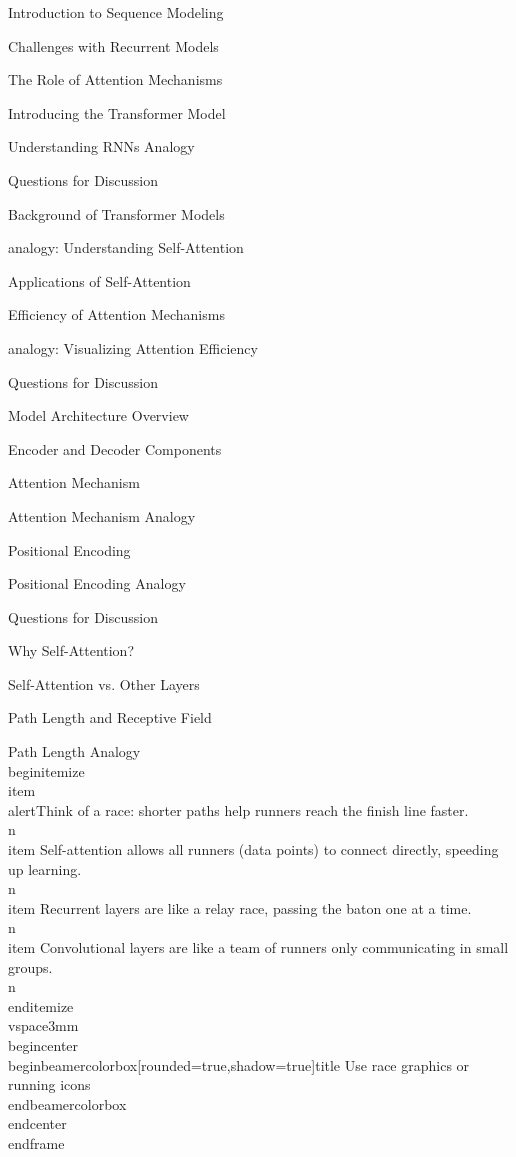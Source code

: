 \documentclass{beamer}
\begin{document}
\begin{frame}[]{Introduction to Sequence Modeling}
\begin{frame}[]{Challenges with Recurrent Models}
\begin{frame}[]{The Role of Attention Mechanisms}
\begin{frame}[]{Introducing the Transformer Model}
\begin{frame}[plain]{Understanding RNNs Analogy}
\begin{frame}[]{Questions for Discussion}
\begin{frame}[]{Background of Transformer Models}
\begin{frame}[plain]{analogy: Understanding Self-Attention}
\begin{frame}[]{Applications of Self-Attention}
\begin{frame}[]{Efficiency of Attention Mechanisms}
\begin{frame}[plain]{analogy: Visualizing Attention Efficiency}
\begin{frame}[]{Questions for Discussion}
\begin{frame}[]{Model Architecture Overview}
\begin{frame}[]{Encoder and Decoder Components}
\begin{frame}[]{Attention Mechanism}
\begin{frame}[plain]{Attention Mechanism Analogy}
\begin{frame}[]{Positional Encoding}
\begin{frame}[plain]{Positional Encoding Analogy}
\begin{frame}[]{Questions for Discussion}
\begin{frame}[]{Why Self-Attention?}
\begin{frame}[]{Self-Attention vs. Other Layers}
\begin{frame}[]{Path Length and Receptive Field}
\begingroup
{}\n{}\n\begin{frame}[plain]{Path Length Analogy}\n\\begin{itemize}
\\item \\alert{Think of a race: shorter paths help runners reach the finish line faster.}\\n\\item Self-attention allows all runners (data points) to connect directly, speeding up learning.\\n\\item Recurrent layers are like a relay race, passing the baton one at a time.\\n\\item Convolutional layers are like a team of runners only communicating in small groups.\\n\\end{itemize}
\\vspace{3mm}
\\begin{center}
\\begin{beamercolorbox}[rounded=true,shadow=true]{title}
Use race graphics or running icons
\\end{beamercolorbox}
\\end{center}
\\end{frame}

\endgroup


\end{frame}
\end{frame}
\end{frame}
\end{frame}
\end{frame}
\end{frame}
\end{frame}
\end{frame}
\end{frame}
\end{frame}
\end{frame}
\end{frame}
\end{frame}
\end{frame}
\end{frame}
\end{frame}
\end{frame}
\end{frame}
\end{frame}
\end{frame}
\end{frame}
\end{frame}
\end{frame}
\end{document}
